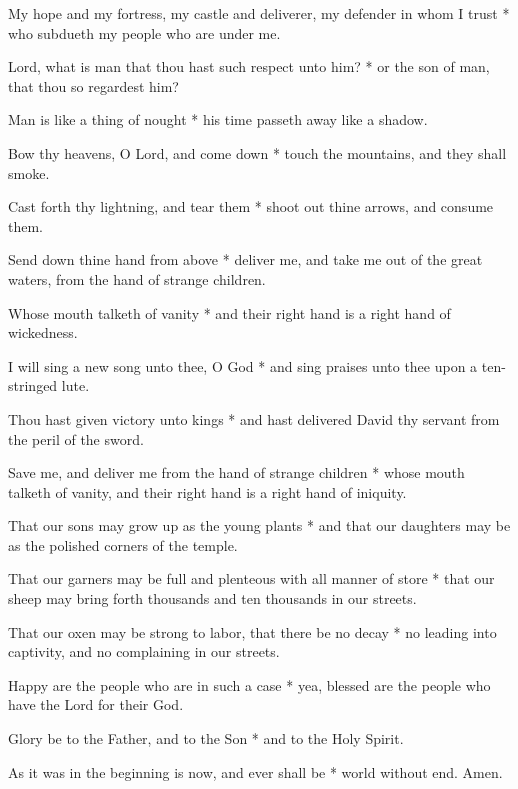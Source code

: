 \begin{multicols}{2}
	My hope and my fortress, my castle and deliverer, my defender in whom I trust * who subdueth my people who are under me.
	
	Lord, what is man that thou hast such respect unto him? * or the son of man, that thou so regardest him?
	
	Man is like a thing of nought * his time passeth away like a shadow.
	
	Bow thy heavens, O Lord, and come down * touch the mountains, and they shall smoke.
	
	Cast forth thy lightning, and tear them * shoot out thine arrows, and consume them.
	
	Send down thine hand from above * deliver me, and take me out of the great waters, from the hand of strange children.
	
	Whose mouth talketh of vanity * and their right hand is a right hand of wickedness.
	
	I will sing a new song unto thee, O God * and sing praises unto thee upon a ten-stringed lute.
	
	Thou hast given victory unto kings * and hast delivered David thy servant from the peril of the sword.
	
	Save me, and deliver me from the hand of strange children * whose mouth talketh of vanity, and their right hand is a right hand of iniquity.
	
	That our sons may grow up as the young plants * and that our daughters may be as the polished corners of the temple.
	
	That our garners may be full and plenteous with all manner of store * that our sheep may bring forth thousands and ten thousands in our streets.
	
	That our oxen may be strong to labor, that there be no decay * no leading into captivity, and no complaining in our streets.
	
	Happy are the people who are in such a case * yea, blessed are the people who have the Lord for their God.
	
	Glory be to the Father, and to the Son * and to the Holy Spirit.
	
	As it was in the beginning is now, and ever shall be * world without end. Amen.
\end{multicols}